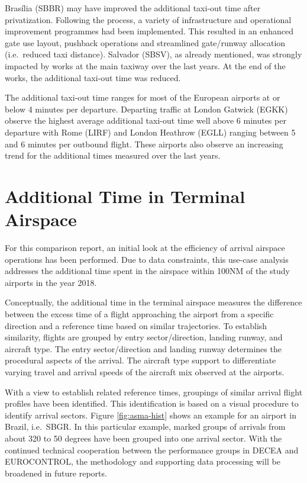 \documentclass[
]{book}
\begin{document}
Brasília (SBBR) may have improved the additional taxi-out time after privatization.
Following the process, a variety of infrastructure and operational improvement programmes had been implemented. This resulted in an enhanced gate use layout, pushback operations and streamlined gate/runway allocation (i.e.~reduced taxi distance).
Salvador (SBSV), as already mentioned, was strongly impacted by works at the main taxiway over the last years. At the end of the works, the additional taxi-out time was reduced.

The additional taxi-out time ranges for most of the European airports at or below 4 minutes per departure.
Departing traffic at London Gatwick (EGKK) observe the highest average additional taxi-out time well above 6 minutes per departure with Rome (LIRF) and London Heathrow (EGLL) ranging between 5 and 6 minutes per outbound flight.
These airports also observe an increasing trend for the additional times measured over the last years.

\hypertarget{additional-time-in-terminal-airspace}{%
\section{Additional Time in Terminal Airspace}\label{additional-time-in-terminal-airspace}}

For this comparison report, an initial look at the efficiency of arrival airspace operations has been performed.
Due to data constraints, this use-case analysis addresses the additional time spent in the airspace within 100NM of the study airports in the year 2018.

Conceptually, the additional time in the terminal airspace measures the difference between the excess time of a flight approaching the airport from a specific direction and a reference time based on similar trajectories.
To establish similarity, flights are grouped by entry sector/direction, landing runway, and aircraft type.
The entry sector/direction and landing runway determines the procedural aspects of the arrival.
The aircraft type support to differentiate varying travel and arrival speeds of the aircraft mix observed at the airports.

With a view to establish related reference times, groupings of similar arrival flight profiles have been identified. This identification is based on a visual procedure to identify arrival sectors.
Figure \ref{fig:asma-hist} shows an example for an airport in Brazil, i.e.~SBGR.
In this particular example, marked groups of arrivals from about 320 to 50 degrees have been grouped into one arrival sector.
With the continued technical cooperation between the performance groups in DECEA and EUROCONTROL, the methodology and supporting data processing will be broadened in future reports.
\end{document}
